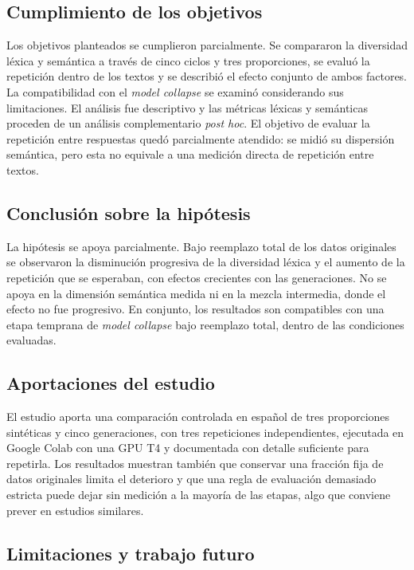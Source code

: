 \documentclass[12pt,letterpaper]{article}
\begin{document}
\subsection{Cumplimiento de los objetivos}

Los objetivos planteados se cumplieron parcialmente. Se compararon la
diversidad léxica y semántica a través de
cinco ciclos y tres proporciones, se evaluó la repetición dentro de los
textos y se describió el efecto conjunto de ambos factores. La
compatibilidad con el \textit{model collapse} se examinó considerando sus
limitaciones. El análisis fue descriptivo y las métricas léxicas y
semánticas proceden de un análisis complementario \textit{post hoc}.
El objetivo de evaluar la repetición entre respuestas quedó parcialmente
atendido: se midió su dispersión semántica, pero esta no equivale a una
medición directa de repetición entre textos.

\subsection{Conclusión sobre la hipótesis}

La hipótesis se apoya parcialmente. Bajo reemplazo total de los datos
originales se observaron la disminución progresiva de la diversidad
léxica y el aumento de la repetición que se esperaban, con efectos
crecientes con las generaciones. No se apoya en la dimensión semántica
medida ni en la mezcla intermedia, donde el efecto no fue progresivo.
En conjunto, los resultados son compatibles con una etapa temprana de
\textit{model collapse} bajo reemplazo total, dentro de las condiciones
evaluadas.

\subsection{Aportaciones del estudio}

El estudio aporta una comparación controlada en español de tres
proporciones sintéticas y cinco generaciones, con tres repeticiones
independientes, ejecutada en Google Colab con una GPU T4 y documentada
con detalle suficiente para repetirla. Los resultados muestran
también que conservar una fracción fija de datos originales limita el
deterioro y que una regla de evaluación demasiado estricta puede dejar
sin medición a la mayoría de las etapas, algo que conviene prever en
estudios similares.

\subsection{Limitaciones y trabajo futuro}
\end{document}
